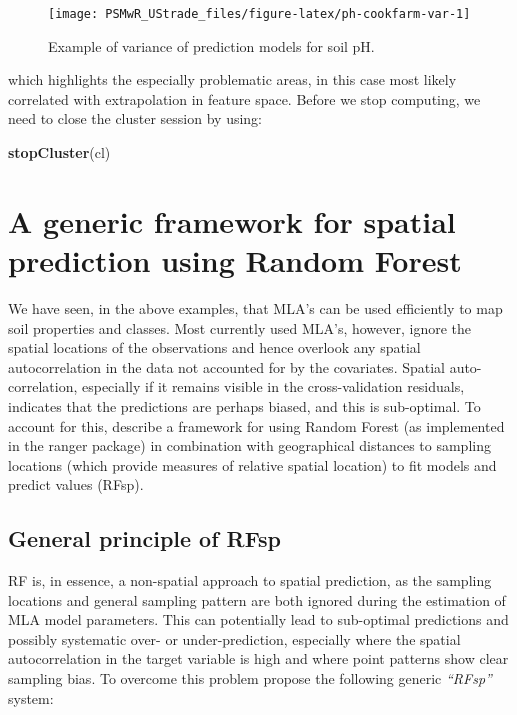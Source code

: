 \documentclass[graybox,natbib,nospthms,UStrade]{svmono}
\newenvironment{Shaded}{\begin{snugshade}}{\end{snugshade}}
\newcommand{\KeywordTok}[1]{\textcolor[rgb]{0.27,0.27,0.27}{\textbf{#1}}}
\newcommand{\NormalTok}[1]{#1}
\begin{document}
\begin{figure}[H]

{\centering \texttt{[image: PSMwR\_UStrade\_files/figure-latex/ph-cookfarm-var-1]} 

}

\caption{Example of variance of prediction models for soil pH.}\label{fig:ph-cookfarm-var}
\end{figure}

which highlights the especially problematic areas, in this case most likely correlated with extrapolation in feature space. Before we stop computing, we need to close the cluster session by using:

\begin{Shaded}
\begin{Highlighting}[]
\KeywordTok{stopCluster}\NormalTok{(cl)}
\end{Highlighting}
\end{Shaded}

\hypertarget{a-generic-framework-for-spatial-prediction-using-random-forest}{%
\section{A generic framework for spatial prediction using Random Forest}\label{a-generic-framework-for-spatial-prediction-using-random-forest}}

We have seen, in the above examples, that MLA's can be used efficiently to
map soil properties and classes. Most currently used MLA's, however, ignore the spatial
locations of the observations and hence overlook any spatial autocorrelation in
the data not accounted for by the covariates. Spatial auto-correlation,
especially if it remains visible in the cross-validation residuals, indicates
that the predictions are perhaps biased, and this is sub-optimal.
To account for this, \citet{Hengl2018RFsp} describe a framework for using Random Forest
(as implemented in the ranger package) in combination with geographical
distances to sampling locations (which provide measures of relative spatial location)
to fit models and predict values (RFsp).

\hypertarget{general-principle-of-rfsp}{%
\subsection{General principle of RFsp}\label{general-principle-of-rfsp}}

RF is, in essence, a non-spatial approach to spatial prediction, as
the sampling locations and general sampling pattern are both ignored during
the estimation of MLA model parameters. This can potentially lead to
sub-optimal predictions and possibly systematic over- or
under-prediction, especially where the spatial autocorrelation in the
target variable is high and where point patterns show clear sampling
bias. To overcome this problem \citet{Hengl2018RFsp} propose the following generic \emph{``RFsp''}
system:
\end{document}
